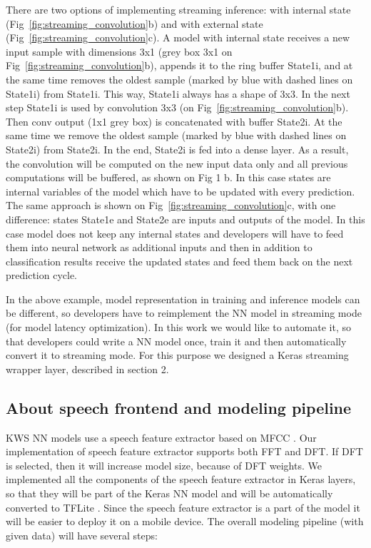 \documentclass[a4paper]{article}
\begin{document}
There are two options of implementing streaming inference: with internal state (Fig~\ref{fig:streaming_convolution}b) and with external state (Fig~\ref{fig:streaming_convolution}c). A model with internal state receives a new input sample with dimensions 3x1 (grey box 3x1 on Fig~\ref{fig:streaming_convolution}b), appends it to the ring buffer State1i, and at the same time removes the oldest sample (marked by blue with dashed lines on State1i) from State1i. This way, State1i always has a shape of 3x3. In the next step State1i is used by convolution 3x3 (on Fig~\ref{fig:streaming_convolution}b). Then conv output (1x1 grey box) is concatenated with buffer State2i. At the same time we remove the oldest sample (marked by blue with dashed lines on State2i) from State2i. In the end, State2i is fed into a dense layer. As a result, the convolution will be computed on the new input data only and all previous computations will be buffered, as shown on Fig 1 b. In this case states are internal variables of the model which have to be updated with every prediction. The same approach is shown on Fig~\ref{fig:streaming_convolution}c, with one difference: states State1e and State2e are inputs and outputs of the model. In this case model does not keep any internal states and developers will have to feed them into neural network as additional inputs and then in addition to classification results receive the updated states and feed them back on the next prediction cycle.

In the above example, model representation in training and inference models can be different, so developers have to reimplement the NN model in streaming mode (for model latency optimization). In this work we would like to automate it, so that developers could write a NN model once, train it and then automatically convert it to streaming mode. For this purpose we designed a Keras streaming wrapper layer, described in section 2.

\subsection{About speech frontend and modeling pipeline}

KWS NN models use a speech feature extractor based on MFCC \cite{MFCC}. Our implementation of speech feature extractor supports both FFT and DFT. If DFT is selected, then it will increase model size, because of DFT weights. We implemented all the components of the speech feature extractor in Keras layers, so that they will be part of the Keras NN model and will be automatically converted to TFLite \cite{TFLITE}. Since the speech feature extractor is a part of the model it will be easier to deploy it on a mobile device. The overall modeling pipeline (with given data)  will have several steps:
\end{document}
